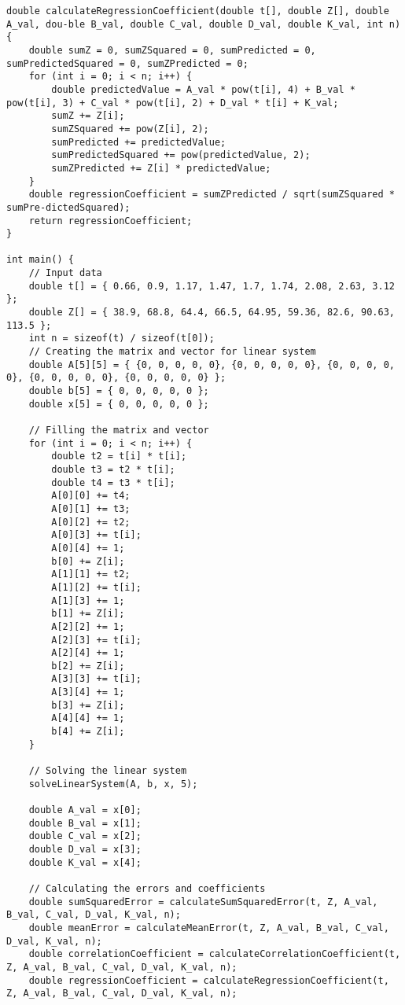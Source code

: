 \documentclass[0.1pt, cmcyralt]{article}
\begin{document}
\begin{lstlisting}
double calculateRegressionCoefficient(double t[], double Z[], double A_val, dou-ble B_val, double C_val, double D_val, double K_val, int n) {
    double sumZ = 0, sumZSquared = 0, sumPredicted = 0, sumPredictedSquared = 0, sumZPredicted = 0;
    for (int i = 0; i < n; i++) {
        double predictedValue = A_val * pow(t[i], 4) + B_val * pow(t[i], 3) + C_val * pow(t[i], 2) + D_val * t[i] + K_val;
        sumZ += Z[i];
        sumZSquared += pow(Z[i], 2);
        sumPredicted += predictedValue;
        sumPredictedSquared += pow(predictedValue, 2);
        sumZPredicted += Z[i] * predictedValue;
    }
    double regressionCoefficient = sumZPredicted / sqrt(sumZSquared * sumPre-dictedSquared);
    return regressionCoefficient;
}

int main() {
    // Input data
    double t[] = { 0.66, 0.9, 1.17, 1.47, 1.7, 1.74, 2.08, 2.63, 3.12 };
    double Z[] = { 38.9, 68.8, 64.4, 66.5, 64.95, 59.36, 82.6, 90.63, 113.5 };
    int n = sizeof(t) / sizeof(t[0]);
    // Creating the matrix and vector for linear system
    double A[5][5] = { {0, 0, 0, 0, 0}, {0, 0, 0, 0, 0}, {0, 0, 0, 0, 0}, {0, 0, 0, 0, 0}, {0, 0, 0, 0, 0} };
    double b[5] = { 0, 0, 0, 0, 0 };
    double x[5] = { 0, 0, 0, 0, 0 };

    // Filling the matrix and vector
    for (int i = 0; i < n; i++) {
        double t2 = t[i] * t[i];
        double t3 = t2 * t[i];
        double t4 = t3 * t[i];
        A[0][0] += t4;
        A[0][1] += t3;
        A[0][2] += t2;
        A[0][3] += t[i];
        A[0][4] += 1;
        b[0] += Z[i];
        A[1][1] += t2;
        A[1][2] += t[i];
        A[1][3] += 1;
        b[1] += Z[i];
        A[2][2] += 1;
        A[2][3] += t[i];
        A[2][4] += 1;
        b[2] += Z[i];
        A[3][3] += t[i];
        A[3][4] += 1;
        b[3] += Z[i];
        A[4][4] += 1;
        b[4] += Z[i];
    }

    // Solving the linear system
    solveLinearSystem(A, b, x, 5);

    double A_val = x[0];
    double B_val = x[1];
    double C_val = x[2];
    double D_val = x[3];
    double K_val = x[4];

    // Calculating the errors and coefficients
    double sumSquaredError = calculateSumSquaredError(t, Z, A_val, B_val, C_val, D_val, K_val, n);
    double meanError = calculateMeanError(t, Z, A_val, B_val, C_val, D_val, K_val, n);
    double correlationCoefficient = calculateCorrelationCoefficient(t, Z, A_val, B_val, C_val, D_val, K_val, n);
    double regressionCoefficient = calculateRegressionCoefficient(t, Z, A_val, B_val, C_val, D_val, K_val, n);


\end{lstlisting}
\end{document}
